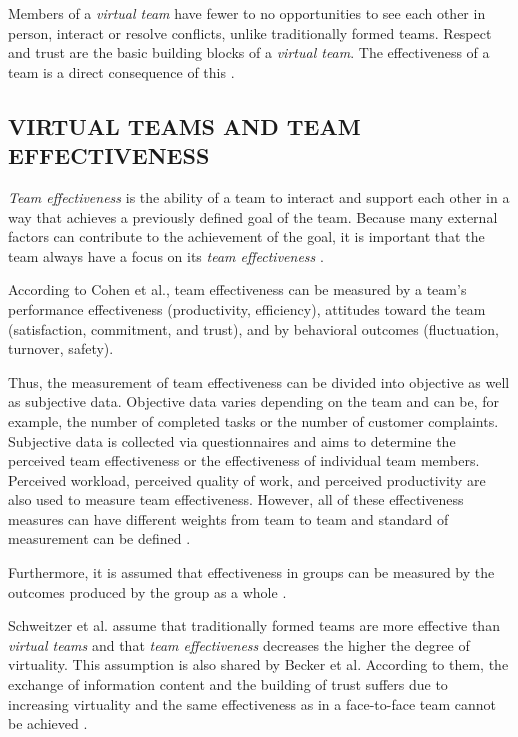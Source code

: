 \documentclass[sigchi]{acmart}
\begin{document}
Members of a \textit{virtual team} have fewer to no opportunities to see each other in person, interact or resolve conflicts, unlike traditionally formed teams. Respect and trust are the basic building blocks of a \textit{virtual team}. The effectiveness of a team is a direct consequence of this \citep[p. 378]{ren2007applying}.

\subsection{VIRTUAL TEAMS AND TEAM EFFECTIVENESS}
\textit{Team effectiveness} is the ability of a team to interact and support each other in a way that achieves a previously defined goal of the team. Because many external factors can contribute to the achievement of the goal, it is important that the team always have a focus on its \textit{team effectiveness} \citep[p. 557]{salas2005there}.

According to Cohen et al.\citep[243-245]{cohen1997makes}, team effectiveness can be measured by a team's performance effectiveness (productivity, efficiency), attitudes toward the team (satisfaction, commitment, and trust), and by behavioral outcomes (fluctuation, turnover, safety). 

Thus, the measurement of team effectiveness can be divided into objective as well as subjective data. Objective data varies depending on the team and can be, for example, the number of completed tasks or the number of customer complaints. Subjective data is collected via questionnaires and aims to determine the perceived team effectiveness or the effectiveness of individual team members. Perceived workload, perceived quality of work, and perceived productivity are also used to measure team effectiveness. However, all of these effectiveness measures can have different weights from team to team and standard of measurement can be defined \citep[9]{pina2008teams}. 

Furthermore, it is assumed that effectiveness in groups can be measured by the outcomes produced by the group as a whole \citep[p. 309]{guzzo1996teams}. 

Schweitzer et al. \citep{schweitzer2010conceptualizing} assume that traditionally formed teams are more effective than \textit{virtual teams} and that \textit{team effectiveness} decreases the higher the degree of virtuality.
This assumption is also shared by Becker et al. According to them, the exchange of information content and the building of trust suffers due to increasing virtuality and the same effectiveness as in a face-to-face team cannot be achieved \citep{handke2019alles}.
\end{document}
